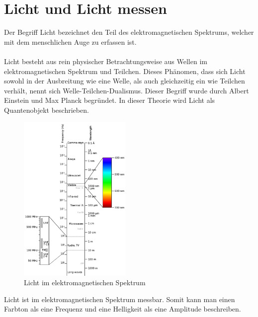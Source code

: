 \documentclass[11pt]{scrartcl}
\begin{document}
\section{Licht und Licht messen} \label{light and measurement}
Der Begriff Licht bezeichnet den Teil des elektromagnetischen Spektrums, welcher mit dem menschlichen Auge zu erfassen ist.\\
\\
Licht besteht aus rein physischer Betrachtungsweise aus Wellen im elektromagnetischen Spektrum und Teilchen. Dieses Phänomen, dass sich
Licht sowohl in der Ausbreitung wie eine Welle, als auch gleichzeitig ein wie Teilchen verhält, nennt sich Welle-Teilchen-Dualismus.
Dieser Begriff wurde durch Albert Einstein und Max Planck begründet. In dieser Theorie wird Licht als Quantenobjekt
beschrieben. \cite{wikiLicht}\\
\begin{figure}
    \vspace{-25pt}
    \begin{center}
        \includegraphics[width=0.48\textwidth]{images/Elektromagnetisches-Spektrum.png}
    \end{center}
    \vspace{-20pt}
    \caption{Licht im elektromagnetischen Spektrum \cite{spectrumLight}}
    \vspace{-15pt}
\end{figure}
\noindent
Licht ist im elektromagnetischen Spektrum messbar. Somit kann man einen Farbton als eine Frequenz und eine Helligkeit als eine Amplitude beschreiben.
\end{document}
